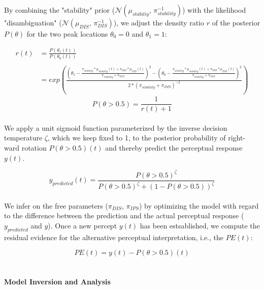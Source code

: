 \documentclass[12pt]{article}
\begin{document}
By combining the "stability" prior ($\mathcal{N}(\mu_{stabiliy},\,\pi_{stability}^{-1})$) with the likelihood "disambiguation" ($\mathcal{N}(\mu_{DIS},\,\pi_{DIS}^{-1})$), we adjust the density ratio $r$ of the posterior $P(\theta)$ for the two peak locations $\theta_0 = 0$ and $\theta_1 = 1$:

\begin{equation}
\begin{split}
r(t) &=\frac{P(\theta_1(t))}{P(\theta_0(t))} \\
     & \\
     &=exp(\frac{(\theta_1- \frac{\pi_{stability} * \mu_{stability}(t) + \pi_{DIS} * \mu_{DIS}(t)}{\pi_{stability} + \pi_{DIS}})^{2}-(\theta_0-\frac{\pi_{stability}*\mu_{stability}(t) + \pi_{DIS}*\mu_{DIS}(t)}{\pi_{stability} + \pi_{DIS}})^{2}}{2 * (\pi_{stability}+\pi_{DIS})^{-2}})
\end{split}
\end{equation}
\begin{equation}
P(\theta > 0.5)=\frac{1}{r(t)+1}
\end{equation} \\

We apply a unit sigmoid function parameterized by the inverse decision temperature $\zeta$, which we keep fixed to 1, to the posterior probability of right-ward rotation $P(\theta>0.5)(t)$ and thereby predict the perceptual response $y(t)$. 

\begin{equation}
 y_{predicted}(t) = \frac{P(\theta > 0.5)^\zeta}{P(\theta > 0.5)^\zeta+(1-P(\theta > 0.5))^\zeta}
\end{equation} \\

We infer on the free parameters ($\pi_{DIS}$, $\pi_{IPS}$) by optimizing the model with regard to the difference between the prediction and the actual perceptual response ($y_{predicted}$ and $y$). Once a new percept $y(t)$ has been estsablished, we compute the residual evidence for the alternative perceptual interpretation, i.e., the $PE(t)$:

\begin{equation}
PE(t) = y(t) - P(\theta > 0.5)(t)
\end{equation}\\

\paragraph{Model Inversion and Analysis}
\end{document}
